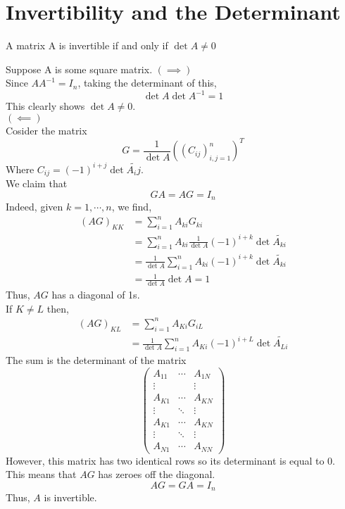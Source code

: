 \documentclass[12pt]{article}
\begin{document}
\section{Invertibility and the Determinant}
\begin{theo}{}
    A matrix A is invertible if and only if \(\det A \neq 0\)
\end{theo}
\begin{prf}{}
Suppose A is some square matrix.
\(\left(\implies\right)\)\\
Since \(AA^{-1} = I_n\), taking the determinant of this,\\
\[\det A \det A^{-1} = 1\]
This clearly shows \(\det A \neq 0\).\\
\(\left(\impliedby \right)\)\\
Cosider the matrix \[G = \frac1{\det A}\left(\left(C_{ij}\right)_{i,j = 1}^n\right)^T\]
Where \(C_{ij} = (-1)^{i+j} \det \tilde{A_ij}\).\\
We claim that \[GA = AG = I_n\]
Indeed, given \(k = 1, \cdots, n\), we find,
\begin{align*}
    \left(AG\right)_{KK} &= \displaystyle\sum_{i=1}^n A_{ki} G_{ki} \\
    &= \displaystyle\sum_{i=1}^n A_{ki}\frac{1}{\det A}(-1)^{i+k} \det \tilde{A_{ki}}\\
    &= \frac1{\det A}\displaystyle\sum_{i=1}^n A_{ki}(-1)^{i+k}\det \tilde{A_{ki}}\\
    &= \frac{1}{\det A} \det A = 1
\end{align*}
Thus, \(AG\) has a diagonal of 1s.\\
If \(K \neq L\) then,\\
\begin{align*}
    \left(AG\right)_{KL} &= \displaystyle\sum_{i=1}^n A_{Ki}G_{iL}\\
    &= \frac{1}{\det A} \displaystyle\sum_{i=1}^n A_{Ki}(-1)^{i+L} \det \tilde{A_{Li}}
\end{align*}
The sum is the determinant of the matrix
\[\begin{pmatrix}
    A_{11} & \cdots & A_{1N}\\
    \vdots & & \vdots\\
    A_{K1} & \cdots & A_{KN}\\
    \vdots & \ddots & \vdots\\
    A_{K1} & \cdots & A_{KN}\\
    \vdots & \ddots & \vdots\\
    A_{N1} & \cdots & A_{NN}
\end{pmatrix}\]
However, this matrix has two identical rows so its determinant is equal to 0.\\
This means that \(AG\) has zeroes off the diagonal.\\
\[AG = GA = I_n\]
Thus, \(A\) is invertible.
\end{prf}
\end{document}
